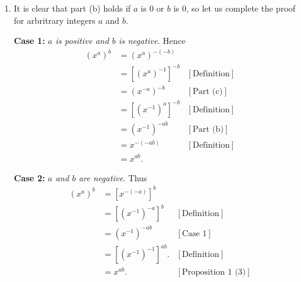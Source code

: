 \begin{enumerate}
\begin{enumerate}
               If $a$ is 0 or $b$ is 0, then Lemma 1.1.1 tells us that
               \eqref{1_1_19_1} holds, so the only remaining possibility is $a$ 
               and $b$ are negative.\footnote{If $a$ is positive and $b$ is
               negative, then interchange the roles of $a$ and $b$ in the 
               induction proof.} Now suppose that $a$ and $b$ are negative.
               Hence
               \begin{align*}
                  x^ax^b &= x^{-(-a)}x^{-(-b)} \\
                     &= (x^{-1})^{-a}(x^{-1})^{-b} &[\text{Definition}] \\
                     &= (x^{-1})^{(-a + (-b))} &[\text{Part (a)}] \\
                     &= x^{-(-a + (-b))} &[\text{Definition}] \\
                     &= x^{a+b}.
               \end{align*}

               Combining this result with part (a), we thus shown that
               \eqref{1_1_19_1} holds for all integers $a$ and $b$. \qed
         \item It is clear that part (b) holds if $a$ is 0 or $b$ is 0, so let
               us complete the proof for arbritrary integers $a$ and $b$.

               \textbf{Case 1:} \textit{$a$ is positive and $b$ is negative}. 
               Hence
               \begin{align*}
                  (x^a)^b &= (x^a)^{-(-b)} \\
                          &= [(x^a)^{-1}]^{-b} &[\text{Definition}] \\
                          &= (x^{-a})^{-b} &[\text{Part (c)}] \\
                          &= [(x^{-1})^a]^{-b} &[\text{Definition}] \\
                          &= (x^{-1})^{-ab} &[\text{Part (b)}] \\
                          &= x^{-(-ab)} &[\text{Definition}] \\
                          &= x^{ab}.
               \end{align*}

               \textbf{Case 2:} \textit{$a$ and $b$ are negative}. Thus
               \begin{align*}
                  (x^a)^b &= [x^{-(-a)}]^b \\
                          &= [(x^{-1})^{-a}]^b &[\text{Definition}] \\
                          &= (x^{-1})^{-ab} &[\text{Case 1}] \\
                          &= [(x^{-1})^{-1}]^{ab}. &[\text{Definition}] \\
                          &= x^{ab}. &[\text{Proposition 1 (3)}]
               \end{align*}


\end{enumerate}
\end{enumerate}
